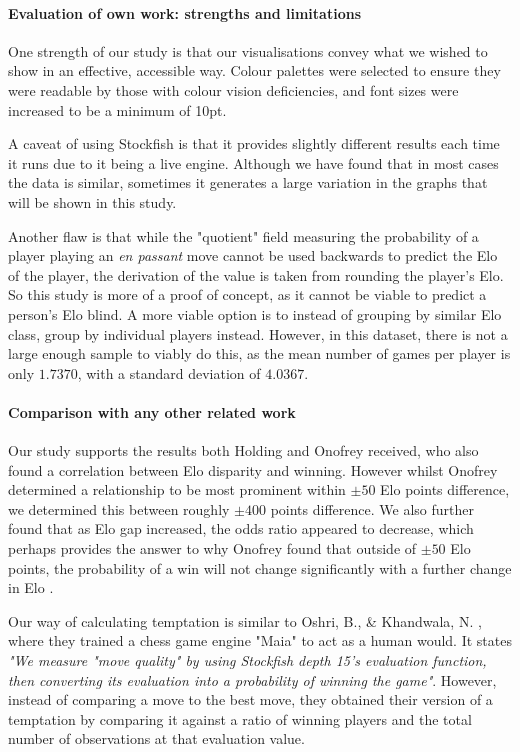 \documentclass[10pt,a4paper]{article}
\begin{document}
\begin{multicols}{2}
\paragraph{Evaluation of own work: strengths and limitations}
One strength of our study is that our visualisations convey what we wished to show in an effective, accessible way. Colour palettes were selected to ensure they were readable by those with colour vision deficiencies, and font sizes were increased to be a minimum of 10pt.

A caveat of using Stockfish is that it provides slightly different results each time it runs due to it being a live engine. Although we have found that in most cases the data is similar, sometimes it generates a large variation in the graphs that will be shown in this study.\newline

Another flaw is that while the "quotient"  field measuring the probability of a player playing an \textit{en passant} move cannot be used backwards to predict the Elo of the player, the derivation of the value is taken from rounding the player's Elo. So this study is more of a proof of concept, as it cannot be viable to predict a person's Elo blind. A more viable option is to instead of grouping by similar Elo class, group by individual players instead. However, in this dataset, there is not a large enough sample to viably do this, as the mean number of games per player is only $1.7370$, with a standard deviation of $4.0367$.


\paragraph{Comparison with any other related work}
Our study supports the results both Holding \cite{PsychologyOfChessSkill} and Onofrey \cite{HowMuchDoesEloMatter} received, who also found a correlation between Elo disparity and winning. However whilst Onofrey \cite{HowMuchDoesEloMatter} determined a relationship to be most prominent within $\pm 50$ Elo points difference, we determined this between roughly $\pm 400$ points difference. We also further found that as Elo gap increased, the odds ratio appeared to decrease, which perhaps provides the answer to why Onofrey found that outside of $\pm 50$ Elo points, the
probability of a win will not change significantly with a further change in Elo \cite{HowMuchDoesEloMatter}. \newline

Our way of calculating temptation is similar to Oshri, B., \& Khandwala, N. \cite{mcilroy2022learning}, where they trained a chess game engine "Maia" to act as a human would. It states \textit{"We measure "move quality" by using Stockfish depth 15's evaluation function, then converting its evaluation into a probability of winning the game"}. However, instead of comparing a move to the best move, they obtained their version of a temptation by comparing it against a ratio of winning players and the total number of observations at that evaluation value.




\end{multicols}
\end{document}
